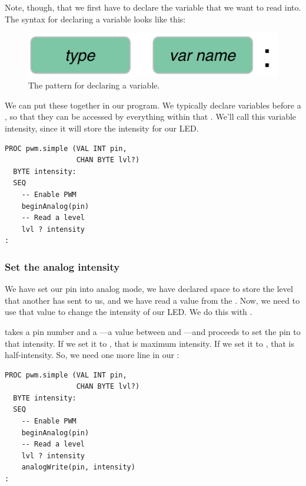 Note, though, that we first have to declare the variable that we want to read into. The syntax for declaring a variable looks like this:

\vspace{3mm}
\begin{figure}[ht]
  \begin{center}
    \includegraphics[width=0.8\linewidth]{images/ch7-var-decl-pattern}
    \caption{The pattern for declaring a variable.}
    \label{image:ch7-var-decl-pattern}
  \end{center}
\end{figure}

We can put these together in our program. We typically declare variables before a \SEQ, so that they can be accessed by everything within that \SEQ. We'll call this variable {\code intensity}, since it will store the intensity for our LED.

\vspace{3mm}
\begin{lstlisting}
PROC pwm.simple (VAL INT pin, 
                 CHAN BYTE lvl?)
  BYTE intensity:
  SEQ
    -- Enable PWM
    beginAnalog(pin)
    -- Read a level
    lvl ? intensity
:
\end{lstlisting}

\newpage

\subsubsection{Set the analog intensity}
We have set our pin into analog mode, we have declared space to store the level that another \PROCedure has sent to us, and we have read a value from the \CHANnel. Now, we need to use that value to change the intensity of our LED. We do this with \aW. 

\aW takes a pin number and a \BYTE---a value between {} and {}---and proceeds to set the pin to that intensity. If we set it to {}, that is maximum intensity. If we set it to {}, that is half-intensity. So, we need one more line in our \SEQ:

\vspace{3mm}
\begin{lstlisting}
PROC pwm.simple (VAL INT pin, 
                 CHAN BYTE lvl?)
  BYTE intensity:
  SEQ
    -- Enable PWM
    beginAnalog(pin)
    -- Read a level
    lvl ? intensity
    analogWrite(pin, intensity)
:
\end{lstlisting}



\newpage

